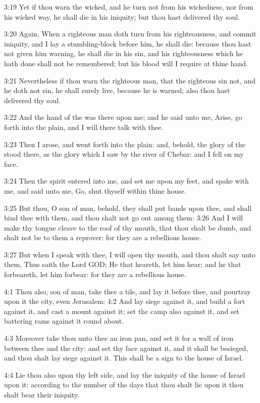 3:19 Yet if thou warn the wicked, and he turn not from his wickedness,
nor from his wicked way, he shall die in his iniquity; but thou hast
delivered thy soul.

3:20 Again, When a righteous man doth turn from his righteousness, and
commit iniquity, and I lay a stumbling-block before him, he shall die:
because thou hast not given him warning, he shall die in his sin, and
his righteousness which he hath done shall not be remembered; but his
blood will I require at thine hand.

3:21 Nevertheless if thou warn the righteous man, that the righteous
sin not, and he doth not sin, he shall surely live, because he is
warned; also thou hast delivered thy soul.

3:22 And the hand of the \LORD was there upon me; and he said unto me,
Arise, go forth into the plain, and I will there talk with thee.

3:23 Then I arose, and went forth into the plain: and, behold, the
glory of the \LORD stood there, as the glory which I saw by the river
of Chebar: and I fell on my face.

3:24 Then the spirit entered into me, and set me upon my feet, and
spake with me, and said unto me, Go, shut thyself within thine house.

3:25 But thou, O son of man, behold, they shall put bands upon thee,
and shall bind thee with them, and thou shalt not go out among them:
3:26 And I will make thy tongue cleave to the roof of thy mouth, that
thou shalt be dumb, and shalt not be to them a reprover: for they are
a rebellious house.

3:27 But when I speak with thee, I will open thy mouth, and thou shalt
say unto them, Thus saith the Lord GOD; He that heareth, let him hear;
and he that forbeareth, let him forbear: for they are a rebellious
house.

4:1 Thou also, son of man, take thee a tile, and lay it before thee,
and pourtray upon it the city, even Jerusalem: 4:2 And lay siege
against it, and build a fort against it, and cast a mount against it;
set the camp also against it, and set battering rams against it round
about.

4:3 Moreover take thou unto thee an iron pan, and set it for a wall of
iron between thee and the city: and set thy face against it, and it
shall be besieged, and thou shalt lay siege against it. This shall be
a sign to the house of Israel.

4:4 Lie thou also upon thy left side, and lay the iniquity of the
house of Israel upon it: according to the number of the days that thou
shalt lie upon it thou shalt bear their iniquity.

